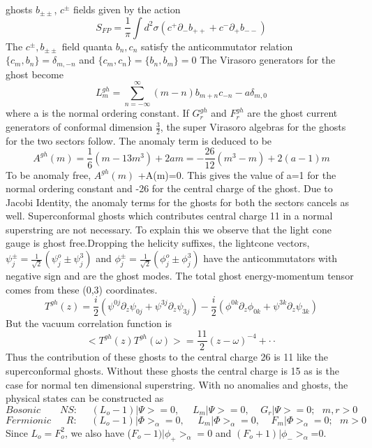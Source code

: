 \documentclass[a4paper,showpacs,preprintnumbers,amsmath,amssymb]{revtex4}
\begin{document}
ghosts $b_{\pm\pm}$, $c^{\pm}$ fields given by the action
\begin{equation}
S_{FP}= \frac{1}{\pi}\int d^2\sigma (c^+\partial_-b_{++}+c^-\partial_+b_{--})
\end{equation}
The $c^{\pm},  b_{\pm\pm}$ field quanta $b_n, c_n$ satisfy the anticommutator relation
$\{c_m, b_n\}= \delta_{m,-n} $ and $\{c_m, c_n\}= \{b_n, b_m\}=0 $
The Virasoro generators for the ghost become
\begin{equation}
L_m^{gh}=\sum^{\infty}_{n=-\infty}(m-n)b_{m+n}c_{-n}-a\delta_{m,0}
\end{equation}
where a is the normal ordering constant. If $G_r^{gh}$ and $F_r^{gh}$ are 
the ghost current generators of conformal dimension $\frac{3}{2}$, the super 
Virasoro algebras for the ghosts for the two sectors follow. The anomaly 
term is deduced to be
\begin{equation}
A^{gh}(m)=\frac{1}{6}(m-13m^3) +2am=-\frac{26}{12}(m^3-m) +2(a-1)m
\end{equation}
To be anomaly free, $A^{gh}(m)$ +A(m)=0. This gives the value of a=1 for the normal 
ordering constant and -26 for the central charge of the ghost. Due to Jacobi 
Identity, the anomaly terms for the ghosts for both the sectors cancels as well.
Superconformal ghosts which contributes central charge 11 in a normal superstring
are not necessary. To explain this we observe that the light cone gauge is
ghost free.Dropping the helicity suffixes, the lightcone vectors,
$\psi^{\pm}_j=\frac{1}{\sqrt{2}}(\psi_j^o \pm \psi^{3}_j )$ and
$\phi^{\pm}_j=\frac{1}{\sqrt{2}}(\phi_j^o \pm \phi^{3}_j) $ have the 
anticommutators with negative sign and are the ghost modes. The total ghost 
energy-momentum tensor comes from these (0,3) coordinates.
\begin{equation}
T^{gh}(z)= \frac{i}{2}( \psi^{0j}\partial_z\psi_{0j}  +
\psi^{3j}\partial_z\psi_{3j})
-\frac{i}{2}( \phi^{0k}\partial_z\phi_{0k}  +
\psi^{3k}\partial_z\psi_{3k} )
\end{equation}
But the vacuum correlation function is
\begin{equation}
<T^{gh}(z)T^{gh}(\omega)> = \frac{11}{2} (z-\omega)^{-4}+ \cdot\cdot
\end{equation}
Thus the contribution of these ghosts to the central charge 26 is 11 like 
the superconformal ghosts. Without these ghosts the central charge is 15 as is the
case for normal ten dimensional superstring.
With no anomalies and ghosts, the physical states can be constructed as
\begin{equation}
Bosonic~~~~~~~~~NS:~~~~~~ (L_o-1)|\Psi> =0,~~~~~~L_m|\Psi>=0,~~~~~G_r|\Psi>=0;~~~m,r>0
\label{56} 
\end{equation}
\begin{equation}
Fermionic~~~~~~~R:~~~~~~ (L_o-1)|\Phi>_{\alpha} =0,~~~~~~L_m|\Phi>_{\alpha}=0,
~~~~~F_m|\Phi>_{\alpha}=0;~~~m>0\label{57}
\end{equation}
Since $L_o = F_o^2$, we also have ($F_o-1)|\phi_+>_{\alpha}=0$ and $(F_o+1)|\phi_->_{\alpha}$=0.
\end{document}
